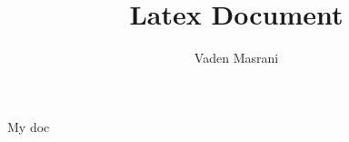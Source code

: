 \documentclass[12pt]{extarticle}
\title{Latex Document}
\author{Vaden Masrani}
\begin{document}
\maketitle

My doc \cite{popper1992}



\end{document}
